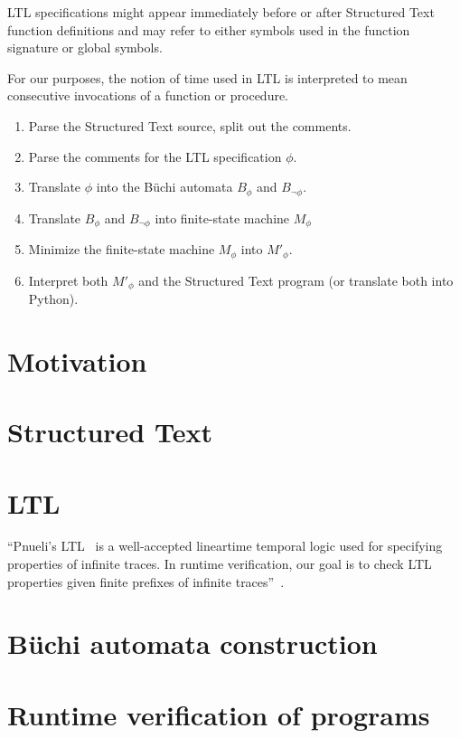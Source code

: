 LTL specifications might appear immediately before or after Structured Text
function definitions and may refer to either symbols used in the function
signature or global symbols.

For our purposes, the notion of time used in LTL is interpreted to mean
consecutive invocations of a function or procedure. 

\begin{enumerate}
\item Parse the Structured Text source, split out the comments.
\item Parse the comments for the LTL specification $\phi$.
\item Translate $\phi$ into the B\"uchi automata $B_\phi$ and $B_{\lnot\phi}$.
\item Translate $B_\phi$ and $B_{\lnot\phi}$ into finite-state machine $M_\phi$
\item Minimize the finite-state machine $M_\phi$ into $M'_\phi$.
\item Interpret both $M'_\phi$ and the Structured Text program (or translate
both into Python).
\end{enumerate}

\section{Motivation}

\section{Structured Text}

\section{LTL}

``Pnueli’s LTL~\cite{pnueli:ltl} is a well-accepted lineartime temporal logic
used for specifying properties of infinite traces. In runtime verification, our
goal is to check LTL properties given finite prefixes of infinite
traces''~\cite{bauer:rv_ltl}.

\section{B\"uchi automata construction}

\section{Runtime verification of programs}

